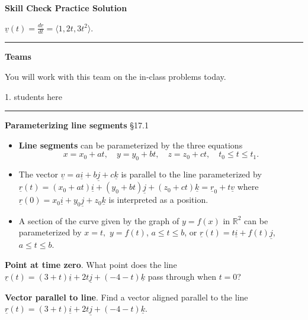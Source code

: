 \documentclass[12pt,letterpaper,noanswers]{exam}
\newcommand{\mb}[1]{\underline{#1}}
\begin{document}
\noindent\textbf{Skill Check Practice Solution}
\begin{questions}
\question $\mb v(t) = \frac{d\mb r}{dt} = \langle 1,2t,3t^2\rangle$.
\end{questions}


\vspace{0.2cm}
\hrule
\vspace{0.2cm}

\noindent\textbf{Teams}

You will work with this team on the in-class problems today.

\begin{multicols}{2}
1.  students here

\end{multicols}


\hrule
\vspace{0.2cm}



\noindent\textbf{Parameterizing line segments} \S 17.1 
\begin{tcolorbox}
\begin{itemize}
\itemsep0em
    \item \textbf{Line segments} can be parameterized by the three equations \[x = x_0 + a t, \quad y = y_0 + b t, \quad z = z_0 + c t, \quad t_0 \leq t \leq t_1. \]
    \item The vector $\mb v = a\mb i +b\mb j + c\mb k$ is parallel to the line parameterized by $\mb r(t) = (x_0+at)\mb i + (y_0 + bt)\mb j + (z_0 + ct)\mb k = \mb r_0 + t\mb v$ where $\mb r(0) = x_0\mb i + y_0\mb j + z_0\mb k$ is interpreted as a position.
    \item A section of the curve given by the graph of $y = f(x)$ in $\mathbb{R}^2$ can be parameterized by $x = t,$ $y = f(t)$, $a\leq t\leq b$, or $\mb r(t) = t\mb i + f(t)\mb j$, $a\leq t\leq b$.
\end{itemize}
\end{tcolorbox}



\noindent\textbf{Point at time zero}.  What point does the line $\mb r(t)=(3+t)\mb i + 2t\mb j+ (-4-t)\mb k$ pass through when $t=0$?


\vspace{1cm}

\noindent\textbf{Vector parallel to line}.
Find a vector aligned parallel to the line $\mb r(t)=(3+t)\mb i + 2t\mb j+ (-4-t)\mb k$.
\end{document}
